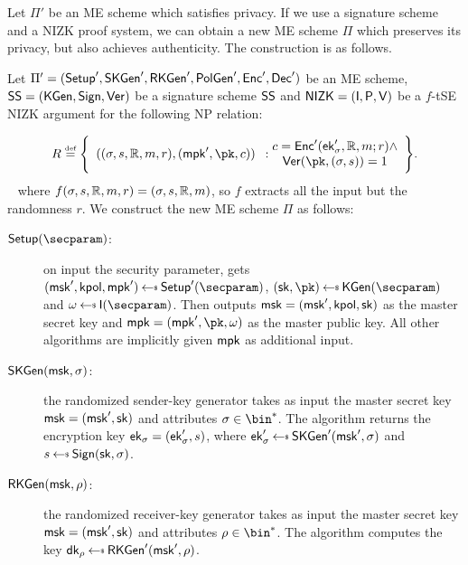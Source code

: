 Let $\Pi'$ be an ME scheme which satisfies privacy. If we use a signature scheme and a NIZK proof system, we can obtain a new ME scheme $\Pi$ which preserves its privacy, but also achieves authenticity. The construction is as follows.

\begin{construction}\label{constr:me_nizk}
    Let $\Pi'=(\mathsf{Setup}',\mathsf{SKGen}',\mathsf{RKGen}', \mathsf{PolGen}', \mathsf{Enc}',\mathsf{Dec}')$ be an ME scheme, $\mathsf{SS} =(\mathsf{KGen},\mathsf{Sign},\mathsf{Ver})$ be a signature scheme $\mathsf{SS}$ and $\mathsf{NIZK}=(\mathsf{I},\mathsf{P},\mathsf{V})$ be a $f$-tSE NIZK argument for the following NP relation:

    \[
        R \eqdef \Biggl\{ \begin{array}{c}((\sattr, \signature, \raccess, \msg, r),(\mpk', \pk, \cipher))\end{array}:\begin{array}{@{}c}
            \cipher = \enc'(\ek'_\sattr, \raccess, \msg; r) \land \\
            \ver(\pk, (\sattr, \signature)) = 1
        \end{array} \Biggr\}.
    \]
    ~\newline
    where $f(\sigma, s, \mathbb{R}, m, r) = (\sigma, s, \mathbb{R}, m)$, so $f$ extracts all the input but the randomness $r$.
    \newline\newline
    We construct the new ME scheme $\Pi$ as follows:
    \begin{description}
        \item[$\setup(\secparam)$:] on input the security parameter, gets $(\msk', \kpol, \mpk') \getsr \setup'(\secparam)$, $(\sk, \pk) \getsr \kgen(\secparam)$ and $\crs \getsr \init(\secparam)$. Then outputs $\mathsf{msk} = (\mathsf{msk}', \mathsf{kpol}, \mathsf{sk})$ as the master secret key and $\mpk = (\mpk', \pk, \crs)$ as the master public key. All other algorithms are implicitly given $\mathsf{mpk}$ as additional input.
        \item[$\mathsf{SKGen}(\mathsf{msk}, \sigma)$:] the randomized sender-key generator takes as input the master secret key $\mathsf{msk} = (\mathsf{msk}', \mathsf{sk})$ and attributes $\sattr \in \bin^*$. The algorithm returns the encryption key $\mathsf{ek}_\sigma = (\mathsf{ek}'_\sigma, s)$, where $\ek'_\sattr \getsr \skgen'(\msk', \sattr)$ and $\signature \getsr \sign(\sk, \sattr)$.
        \item[$\mathsf{RKGen}(\mathsf{msk}, \rho)$:] the randomized receiver-key generator takes as input the master secret key $\mathsf{msk} = (\mathsf{msk}', \mathsf{sk})$ and attributes $\rattr \in \bin^*$. The algorithm computes the key $\dk_\rattr \getsr \rkgen'(\msk', \rattr)$.

\end{description}
\end{construction}
